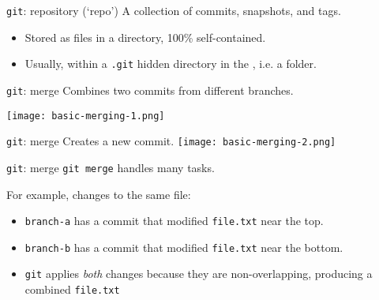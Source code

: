 \documentclass[12pt,aspectratio=169]{beamer}
\begin{document}
\begin{frame}{\texttt{git}: repository (‘repo’)}
  {\Large \centering A collection of commits, snapshots, and tags.}

  \bigskip
  \begin{itemize}
    \item Stored as files in a directory, 100\% self-contained.
    \item Usually, within a \texttt{.git} hidden directory in the , i.e. a folder.
  \end{itemize}
\end{frame}

\begin{frame}{\texttt{git}: merge} \Large
  Combines two commits from different branches.

  \texttt{[image: basic-merging-1.png]}
\end{frame}

\begin{frame}{\texttt{git}: merge} \Large
  Creates a new commit.
  \texttt{[image: basic-merging-2.png]}
\end{frame}

\begin{frame}{\texttt{git}: merge} \large
  \texttt{git merge}  handles many tasks.

  \bigskip
  For example, changes to the same file:

  \begin{itemize}
    \item \texttt{branch-a} has a commit that modified \texttt{file.txt} near the top.
    \item \texttt{branch-b} has a commit that modified \texttt{file.txt} near the bottom.
    \item \texttt{git} applies \emph{both} changes because they are non-overlapping, producing a combined \texttt{file.txt}
  \end{itemize}
\end{frame}
\end{document}
